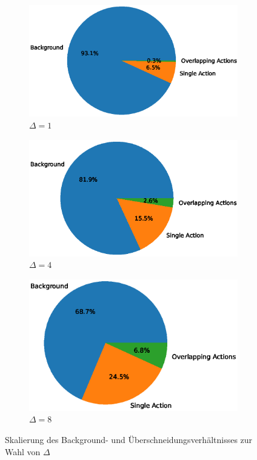 \begin{figure}
    \centering
    \begin{subfigure}{.3\textwidth}
        \centering
        \includegraphics[width=.95\linewidth]{img/data-plots/1sec/background_ratio_all_1sek.eps}
        \caption{$\Delta = 1$}
    \end{subfigure}%
    \begin{subfigure}{.3\textwidth}
        \centering
        \includegraphics[width=.95\linewidth]{img/data-plots/4sec/background_ratio_all_202010-1419-3706.eps}
        \caption{$\Delta = 4$}
    \end{subfigure}
    \begin{subfigure}{.3\textwidth}
        \centering
        \includegraphics[width=.95\linewidth]{img/data-plots/8sec/background_ratio_all_202010-1419-4303.eps}
        \caption{$\Delta = 8$}
    \end{subfigure}
    \caption{Skalierung des Background- und Überschneidungsverhältnisses zur Wahl von $\Delta$}
    \label{fig:ratios}
\end{figure}

